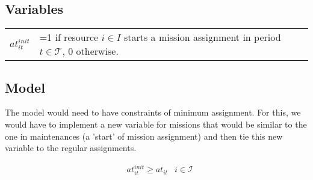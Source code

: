 \documentclass[a4paper,11pt]{article}
\begin{document}
     \subsection{Variables}
        
        \begin{tabular}{ll}
            $at^{init}_{it}$    &  =1 if resource $i \in I$ starts a mission assignment in period $t \in \mathcal{T}$, 0 otherwise. \\
        \end{tabular}

    \subsection{Model}

    The model would need to have constraints of minimum assignment. For this, we would have to implement a new variable for missions that would be similar to the one in maintenances (a 'start' of mission assignment) and then tie this new variable to the regular assignments.

        \begin{align}
            &  at^{init}_{it} \geq at_{it}
                & i \in \mathcal{I} \label{eq:min_maintenace2}\\
        \end{align}



\clearpage



% 


\end{document}
